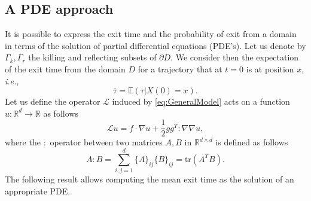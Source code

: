 \subsection{A PDE approach}\label{sec:PDEs}
It is possible to express the exit time and the probability of exit from a domain in terms of the solution of partial differential equations (PDE's).
Let us denote by $\Gamma_k,\Gamma_r$ the killing and reflecting subsets of $\partial D$. We consider then the expectation of the exit time from the domain $D$ for a trajectory that at $t=0$ is at position $x$, \textit{i.e.},
\begin{equation}\label{eq:ExpTau}
	\bar\tau = \mathbb{E}(\tau | X(0) = x).
\end{equation}
Let us define the operator $\mathcal L$ induced by \eqref{eq:GeneralModel} acts on a function $u\colon \mathbb{R}^d \rightarrow \mathbb{R}$  as follows
\begin{equation}\label{eq:LOperator}
	\mathcal Lu = f \cdot \nabla u + \frac{1}{2} gg^T : \nabla \nabla u,
\end{equation}
where the $:$ operator between two matrices $A,B$ in $\mathbb{R}^{d\times d}$ is defined as follows
\begin{equation}\label{eq:twoPoints}
	A : B = \sum_{i,j = 1}^d \{A\}_{ij}\{B\}_{ij} = \text{tr}(A^TB).
\end{equation}
The following result allows computing the mean exit time as the solution of an appropriate PDE.

